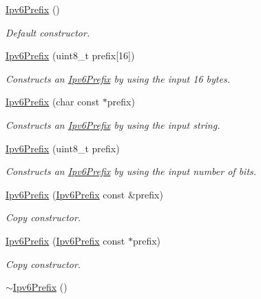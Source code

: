 \begin{DoxyCompactItemize}
\item 
\hyperlink{classns3_1_1Ipv6Prefix_af8a81e427665ce2f63d807edbd34e6fe}{Ipv6\+Prefix} ()
\begin{DoxyCompactList}\small\item\em Default constructor. \end{DoxyCompactList}\item 
\hyperlink{classns3_1_1Ipv6Prefix_a7af7719eef4823f57c046033584643ba}{Ipv6\+Prefix} (uint8\+\_\+t prefix\mbox{[}16\mbox{]})
\begin{DoxyCompactList}\small\item\em Constructs an \hyperlink{classns3_1_1Ipv6Prefix}{Ipv6\+Prefix} by using the input 16 bytes. \end{DoxyCompactList}\item 
\hyperlink{classns3_1_1Ipv6Prefix_a50423ee6d5a9baf0d968aae3b9d57a8a}{Ipv6\+Prefix} (char const $\ast$prefix)
\begin{DoxyCompactList}\small\item\em Constructs an \hyperlink{classns3_1_1Ipv6Prefix}{Ipv6\+Prefix} by using the input string. \end{DoxyCompactList}\item 
\hyperlink{classns3_1_1Ipv6Prefix_a0df62b59a6c0fbbce73e6a2530093ce2}{Ipv6\+Prefix} (uint8\+\_\+t prefix)
\begin{DoxyCompactList}\small\item\em Constructs an \hyperlink{classns3_1_1Ipv6Prefix}{Ipv6\+Prefix} by using the input number of bits. \end{DoxyCompactList}\item 
\hyperlink{classns3_1_1Ipv6Prefix_a40d70c3afa900853198a10efe2136f59}{Ipv6\+Prefix} (\hyperlink{classns3_1_1Ipv6Prefix}{Ipv6\+Prefix} const \&prefix)
\begin{DoxyCompactList}\small\item\em Copy constructor. \end{DoxyCompactList}\item 
\hyperlink{classns3_1_1Ipv6Prefix_af8ad04e1f06a966ba8a117c675ea12cd}{Ipv6\+Prefix} (\hyperlink{classns3_1_1Ipv6Prefix}{Ipv6\+Prefix} const $\ast$prefix)
\begin{DoxyCompactList}\small\item\em Copy constructor. \end{DoxyCompactList}\item 
\hyperlink{classns3_1_1Ipv6Prefix_a493bbbaa4d1213868c6d575e460d62b5}{$\sim$\+Ipv6\+Prefix} ()

\end{DoxyCompactItemize}
